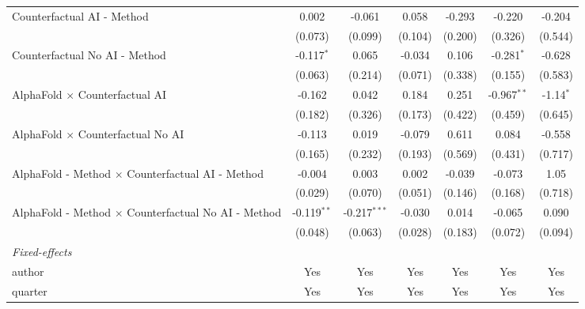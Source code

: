 \begin{tabular}{lcccccc}
   Counterfactual AI - Method                                 & 0.002         & -0.061         & 0.058        & -0.293  & -0.220        & -0.204\\   
                                                              & (0.073)       & (0.099)        & (0.104)      & (0.200) & (0.326)       & (0.544)\\   
   Counterfactual No AI - Method                              & -0.117$^{*}$  & 0.065          & -0.034       & 0.106   & -0.281$^{*}$  & -0.628\\   
                                                              & (0.063)       & (0.214)        & (0.071)      & (0.338) & (0.155)       & (0.583)\\   
   AlphaFold $\times$ Counterfactual AI                       & -0.162        & 0.042          & 0.184        & 0.251   & -0.967$^{**}$ & -1.14$^{*}$\\   
                                                              & (0.182)       & (0.326)        & (0.173)      & (0.422) & (0.459)       & (0.645)\\   
   AlphaFold $\times$ Counterfactual No AI                    & -0.113        & 0.019          & -0.079       & 0.611   & 0.084         & -0.558\\   
                                                              & (0.165)       & (0.232)        & (0.193)      & (0.569) & (0.431)       & (0.717)\\   
   AlphaFold - Method $\times$ Counterfactual AI - Method     & -0.004        & 0.003          & 0.002        & -0.039  & -0.073        & 1.05\\   
                                                              & (0.029)       & (0.070)        & (0.051)      & (0.146) & (0.168)       & (0.718)\\   
   AlphaFold - Method $\times$ Counterfactual No AI - Method  & -0.119$^{**}$ & -0.217$^{***}$ & -0.030       & 0.014   & -0.065        & 0.090\\   
                                                              & (0.048)       & (0.063)        & (0.028)      & (0.183) & (0.072)       & (0.094)\\   
   \midrule
   \emph{Fixed-effects}\\
   author                                                     & Yes           & Yes            & Yes          & Yes     & Yes           & Yes\\  
   quarter                                                    & Yes           & Yes            & Yes          & Yes     & Yes           & Yes\\  

\end{tabular}
